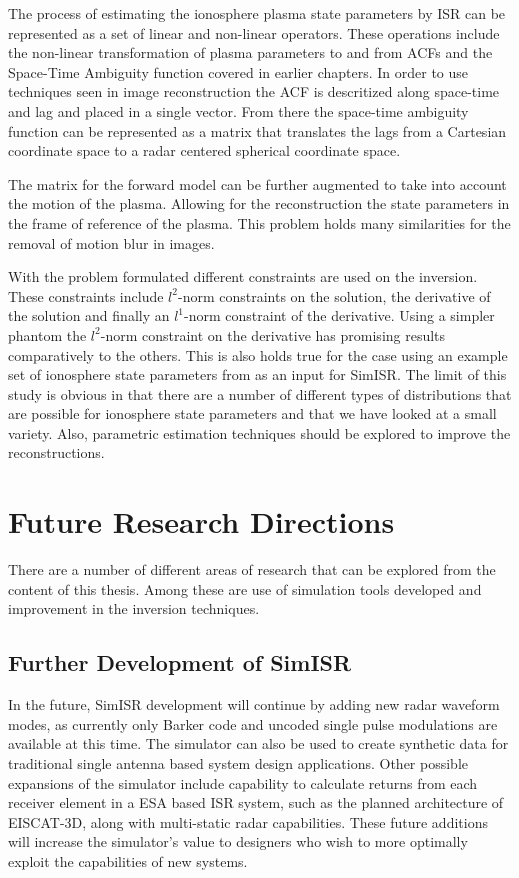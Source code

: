 The process of estimating the ionosphere plasma state parameters by ISR can be represented as a set of linear and non-linear operators. These operations include the non-linear transformation of plasma parameters to and from ACFs and the Space-Time Ambiguity function covered in earlier chapters. In order to use techniques seen in image reconstruction the ACF is descritized along space-time and lag and placed in a single vector. From there the space-time ambiguity function can be represented as a matrix that translates the lags from a Cartesian coordinate space to a radar centered spherical coordinate space. 

The matrix for the forward model can be further augmented to take into account the motion of the plasma. Allowing for the reconstruction the state parameters in the frame of reference of the plasma. This problem holds many similarities for the removal of motion blur in images.

With the problem formulated different constraints are used on the inversion. These constraints include $l^2$-norm constraints on the solution, the derivative of the solution and finally an $l^1$-norm constraint of the derivative. Using a simpler phantom the $l^2$-norm constraint on the derivative has promising results comparatively to the others. This is also holds true for the case using an example set of ionosphere state parameters from \cite{Perry:2015jf} as an input for SimISR. The limit of this study is obvious in that there are a number of different types of distributions that are possible for ionosphere state parameters and that we have looked at a small variety. Also, parametric estimation techniques should be explored to improve the reconstructions. 

\section{Future Research Directions}

There are a number of different areas of research that can be explored from the content of this thesis. Among these are use of simulation tools developed and improvement in the inversion techniques.


\subsection{Further Development of SimISR}

In the future, SimISR development will continue by adding new radar waveform modes, as currently only Barker code and uncoded single pulse modulations are available at this time. The simulator can also be used to create synthetic data for traditional single antenna based system design applications. Other possible expansions of the simulator include capability to calculate returns from each receiver element in a ESA based ISR system, such as the planned architecture of EISCAT-3D, along with multi-static radar capabilities. These future additions will increase the simulator's value to designers who wish to more optimally exploit the capabilities of new systems. 

